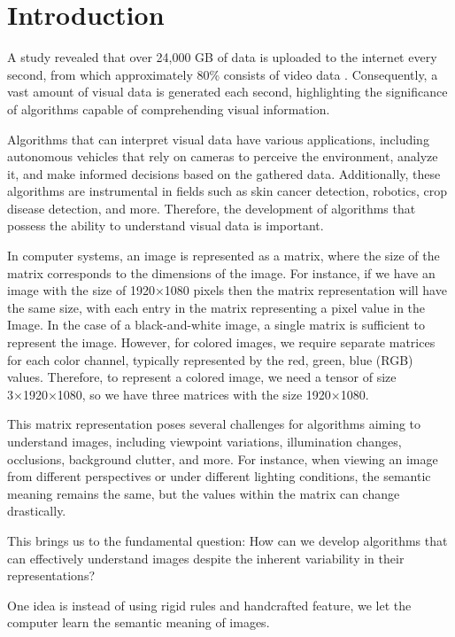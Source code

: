 \section{Introduction} \label{Introduction}

A study revealed that over 24,000 GB of data is uploaded to the internet every second, from which approximately 80\% consists of video data \citep{CiscoInternetStudy}.
Consequently, a vast amount of visual data is generated each second, highlighting the significance of algorithms capable of comprehending visual information.

Algorithms that can interpret visual data have various applications, including autonomous vehicles that rely on cameras to perceive the environment, analyze it, and make informed decisions based on the gathered data. Additionally, these algorithms are instrumental in fields such as skin cancer detection, robotics, crop disease detection, and more. Therefore, the development of algorithms that possess the ability to understand visual data is important.

In computer systems, an image is represented as a matrix, where the size of the matrix corresponds to the dimensions of the image.
For instance, if we have an image with the size of 1920×1080 pixels then the matrix representation will have the same size, with each entry in the matrix representing a pixel value in the Image.
In the case of a black-and-white image, a single matrix is sufficient to represent the image.
However, for colored images, we require separate matrices for each color channel, typically represented by the red, green, blue (RGB) values. Therefore, to represent a colored image, we need a tensor of size 3×1920×1080, so we have three matrices with the size 1920×1080.

This matrix representation poses several challenges for algorithms aiming to understand images, including viewpoint variations, illumination changes, occlusions, background clutter, and more.
For instance, when viewing an image from different perspectives or under different lighting conditions, the semantic meaning remains the same, but the values within the matrix can change drastically.

This brings us to the fundamental question: How can we develop algorithms that can effectively understand images despite the inherent variability in their representations?

One idea is instead of using rigid rules and handcrafted feature, we let the computer learn the semantic meaning of images.

